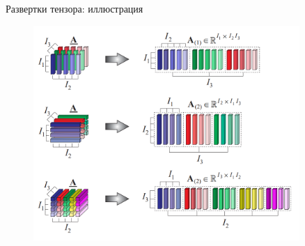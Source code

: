 \begin{frame}{Развертки тензора: иллюстрация}
\begin{figure}
    \centering
    \includegraphics[width=0.9\textwidth]{lecture_11/figs/matricization.png}
\end{figure}
\end{frame}

